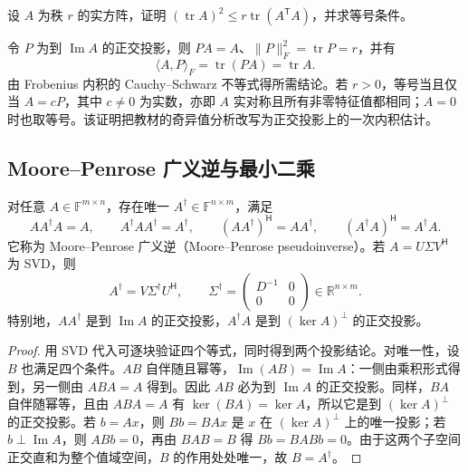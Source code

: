 \begin{example}
设 $A$ 为秩 $r$ 的实方阵，证明 $(\operatorname{tr}A)^2\leq r\operatorname{tr}(A^{\mathsf T}A)$，并求等号条件。
\end{example}
\begin{solve}
令 $P$ 为到 $\operatorname{Im}A$ 的正交投影，则 $PA=A$、$\|P\|_F^2=\operatorname{tr}P=r$，并有
\[
\langle A,P\rangle_F=\operatorname{tr}(PA)=\operatorname{tr}A.
\]
由 Frobenius 内积的 Cauchy--Schwarz 不等式得所需结论。若 $r>0$，等号当且仅当 $A=cP$，其中 $c\ne0$ 为实数，亦即 $A$ 实对称且所有非零特征值都相同；$A=0$ 时也取等号。该证明把教材的奇异值分析改写为正交投影上的一次内积估计。
\end{solve}

\subsection{Moore--Penrose 广义逆与最小二乘}

\begin{theorem}
\label{thm:xie-ip-pseudoinverse}
对任意 $A\in\mathbb F^{m\times n}$，存在唯一 $A^\dagger\in\mathbb F^{n\times m}$，满足
\begin{equation}
\label{eq:xie-ip-penrose}
AA^\dagger A=A,\qquad A^\dagger AA^\dagger=A^\dagger,
\qquad(AA^\dagger)^{\mathsf H}=AA^\dagger,\qquad
(A^\dagger A)^{\mathsf H}=A^\dagger A.
\end{equation}
它称为 Moore--Penrose 广义逆（Moore--Penrose pseudoinverse）。若 $A=U\Sigma V^{\mathsf H}$ 为 SVD，则
\[
A^\dagger=V\Sigma^\dagger U^{\mathsf H},\qquad
\Sigma^\dagger=\begin{pmatrix}D^{-1}&0\\0&0\end{pmatrix}\in\mathbb R^{n\times m}.
\]
特别地，$AA^\dagger$ 是到 $\operatorname{Im}A$ 的正交投影，$A^\dagger A$ 是到 $(\ker A)^\perp$ 的正交投影。
\end{theorem}
\begin{proof}
用 SVD 代入可逐块验证四个等式，同时得到两个投影结论。对唯一性，设 $B$ 也满足四个条件。$AB$ 自伴随且幂等，$\operatorname{Im}(AB)=\operatorname{Im}A$：一侧由乘积形式得到，另一侧由 $ABA=A$ 得到。因此 $AB$ 必为到 $\operatorname{Im}A$ 的正交投影。同样，$BA$ 自伴随幂等，且由 $ABA=A$ 有 $\ker(BA)=\ker A$，所以它是到 $(\ker A)^\perp$ 的正交投影。若 $b=Ax$，则 $Bb=BAx$ 是 $x$ 在 $(\ker A)^\perp$ 上的唯一投影；若 $b\perp\operatorname{Im}A$，则 $ABb=0$，再由 $BAB=B$ 得 $Bb=BABb=0$。由于这两个子空间正交直和为整个值域空间，$B$ 的作用处处唯一，故 $B=A^\dagger$。
\end{proof}


